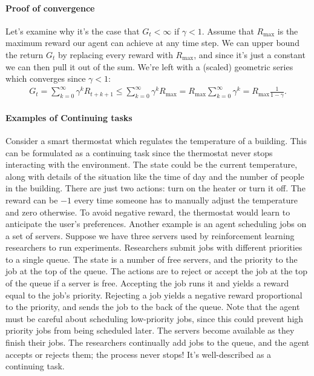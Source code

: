 \documentclass[12pt]{article}
\begin{document}
\paragraph{Proof of convergence} Let's examine why it's the case that $G_t < \infty$ if $\gamma < 1$. Assume that $R_{\textrm{max}}$ is the maximum reward our agent can achieve at any time step. We can upper bound the return $G_t$ by replacing every reward with $R_{\textrm{max}}$, and since it's just a constant we can then pull it out of the sum. We're left with a (scaled) geometric series which converges since $\gamma < 1$:
\begin{align*}
  G_t = \sum_{k=0}^{\infty} \gamma^k R_{t+k+1} \leq \sum_{k=0}^\infty \gamma^k R_{\textrm{max}} = R_{\textrm{max}} \sum_{k=0}^\infty \gamma^k = R_{\textrm{max}} \frac{1}{1-\gamma}.
\end{align*}

\paragraph{Examples of Continuing tasks} Consider a smart thermostat which regulates the temperature of a building. This can be formulated as a continuing task since the thermostat never stops interacting with the environment. The state could be the current temperature, along with details of the situation like the time of day and the number of people in the building. There are just two actions: turn on the heater or turn it off. The reward can be $-1$ every time someone has to manually adjust the temperature and zero otherwise. To avoid negative reward, the thermostat would learn to anticipate the user's preferences. Another example is an agent scheduling jobs on a set of servers. Suppose we have three servers used  by reinforcement learning researchers to run experiments. Researchers submit jobs with different priorities to a single queue. The state is a number of free servers, and the priority to the job at the top of the queue. The actions are to reject or accept the job at the top of the queue if a server is free. Accepting the job runs it and yields a reward equal to the job's priority. Rejecting a job yields a negative reward proportional to the priority, and sends the job to the back of the queue. Note that the agent must be careful about scheduling low-priority jobs, since this could prevent high priority jobs from being scheduled later. The servers become available as they finish their jobs. The researchers continually add jobs to the queue, and the agent accepts or rejects them; the process never stops!  It's well-described as a continuing task.
\end{document}
